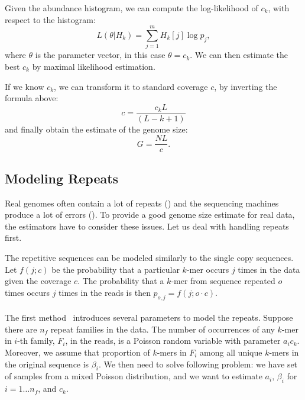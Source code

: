 Given the abundance histogram, we can compute the log-likelihood of $c_k$, with respect to the histogram:
$$L(\theta | H_k) = \sum_{j=1}^m H_k[j] \log p_j,$$
where $\theta$ is the parameter vector, in this case $\theta = c_k$.
We can then estimate the best $c_k$ by maximal likelihood estimation.

If we know $c_k$, we can transform it to standard coverage $c$, by inverting the formula above:
$$c = \frac{c_k L}{(L - k + 1)}$$
and finally obtain the estimate of the genome size:
$$G = \frac{NL}{c}.$$

\subsection{Modeling Repeats}\label{subsec:repeatmodles}

Real genomes often contain a lot of repeats () and the sequencing machines produce a lot of errors (). To provide a good genome size estimate for real data, the estimators have to consider these issues. Let us deal with handling repeats first.

The repetitive sequences can be modeled similarly to the single copy sequences. Let $f(j; c)$ be the probability that a particular $k$-mer occurs $j$ times in the data given the coverage $c$. The probability that a $k$-mer from sequence repeated $o$ times occurs $j$ times in the reads is then $p_{o,j} = f(j; o\cdot c)$.

\paragraph{}
The first method~\cite{waterman} introduces several parameters to model the repeats.
Suppose there are $n_f$ repeat families in the data. The number of occurrences of any $k$-mer in $i$-th family, $F_i$, in the reads, is a Poisson random variable with parameter $a_i c_k$. Moreover, we assume that proportion of $k$-mers in $F_i$ among all unique $k$-mers in the original sequence is $\beta_i$.
We then need to solve following problem: we have set of samples from a mixed Poisson distribution, and we want to estimate $a_i,\,\beta_i$ for $i = 1\dots n_f$, and $c_k$.

